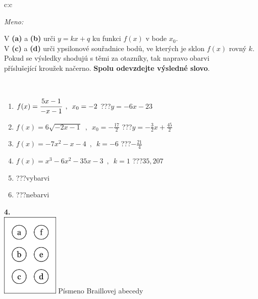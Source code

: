 \documentclass[10pt]{report}
\begin{document}
\begin{tabular}{c:c}
\begin{minipage}[c][104.5mm][t]{0.5\linewidth}
\begin{center}
\textit{Meno:}\phantom{xxxxxxxxxxxxxxxxxxxxxxxxxxxxxxxxxxxxxxxxxxxxxxxxxxxxxxxxxxxxxxxxx}\\[5mm]
\begin{minipage}{0.95\linewidth}
\begin{center}
V \textbf{(a)} a \textbf{(b)} urči  $y = kx + q$ ku funkci $f(x)$ v bode $x_0$.\\V \textbf{(c)} a \textbf{(d)} urči ypsilonové souřadnice bodů, ve kterých je sklon $f(x)$ rovný $k$.\\Pokud se výsledky shodujú s těmi za otazníky, tak napravo obarvi\\příslušející kroužek načerno. \textbf{Spolu odevzdejte výsledné slovo}.
\end{center}
\end{minipage}
\\[1mm]
\begin{minipage}{0.79\linewidth}
\begin{center}
\begin{varwidth}{\linewidth}
\begin{enumerate}
\small
\item $f(x)=\cfrac{5x-1}{-x-1}\enspace , \enspace x_0=-2$\quad \dotfill\; ???\;\dotfill \quad $y = -6x-23$
\item $f(x)=6\sqrt{-2x-1}\enspace , \enspace x_0=-\frac{17}{2}$\quad \dotfill\; ???\;\dotfill \quad $y = -\frac{3}{2}x+\frac{45}{2}$
\item $f(x)=-7x^2-x-4\enspace , \enspace k=-6$\quad \dotfill\; ???\;\dotfill \quad $-\frac{21}{4}$
\item $f(x)=x^3-6x^2-35x-3\enspace , \enspace k=1$\quad \dotfill\; ???\;\dotfill \quad $35 , 207$
\item \quad \dotfill\; ???\;\dotfill \quad vybarvi
\item \quad \dotfill\; ???\;\dotfill \quad nebarvi
\end{enumerate}
\end{varwidth}
\end{center}
\end{minipage}
\begin{minipage}{0.20\linewidth}
\begin{center}
{\Huge\bfseries 4.} \\[2mm]
\includegraphics[height=40mm]{../images/braille.png}
{\small Písmeno Braillovej abecedy}
\end{center}
\end{minipage}
\end{center}
\end{minipage}
%
\end{tabular}
\end{document}
